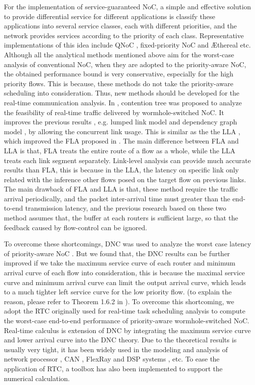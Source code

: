 \documentclass[10pt,journal]{IEEEtran}
\begin{document}
For the implementation of service-guaranteed NoC, a simple and effective solution to provide differential service for different applications is classify these applications into several service classes, each with different priorities, and the network provides services according to the priority of each class. Representative implementations of this idea include QNoC \cite{BCGK04}, fixed-priority NoC \cite{Shi:2008:RCA:1397757.1397996} and {{\AE}thereal} \cite{GoDR05} etc. Although all the analytical methods mentioned above aim for the worst-case analysis of conventional NoC, when they are adopted to the priority-aware NoC, the obtained performance bound is very conservative, especially for the high priority flows. This is because, these methods do not take the priority-aware scheduling into consideration. Thus, new methods should be developed for the real-time communication analysis. In \cite{LuJS05}, contention tree was proposed to analyze the feasibility of real-time traffic delivered by wormhole-switched NoC. It improves the previous results , e.g. lumped link model \cite{707545} and dependency graph model \cite{708526}, by allowing the concurrent link usage. This is similar as the the LLA \cite{73}, which improved the FLA proposed in \cite{Shi:2008:RCA:1397757.1397996}. The main difference between FLA and LLA is that, FLA treats the entire route of a flow as a whole, while the LLA treats each link segment separately. Link-level analysis can provide much accurate results than FLA, this is because in the LLA, the latency on specific link only related with the inference other flows posed on the target flow on previous links. The main drawback of FLA and LLA is that, these method require the traffic arrival periodically, and the packet inter-arrival time must greater than the end-to-end transmission latency, and the previous research based on these two method assumes that, the buffer at each routers is sufficient large, so that the feedback caused by flow-control can be ignored.

To overcome these shortcomings, DNC was used to analyze the worst case latency of priority-aware NoC \cite{Qian489900}. But we found that, the DNC results can be further improved if we take the maximum service curve of each router and minimum arrival curve of each flow into consideration, this is because the maximal service curve and minimum arrival curve can limit the output arrival curve, which leads to a much tighter left service curve for the low priority flow. (to explain the reason, please refer to Theorem 1.6.2 in \cite{Boudec2001Network}). To overcome this shortcoming, we adopt the RTC \cite{1253607} originally used for real-time task scheduling analysis to compute the worst-case end-to-end performance of priority-aware wormhole-switched NoC. Real-time calculus is extension of DNC by integrating the maximum service curve and lower arrival curve into the DNC theory. Due to the theoretical results is usually very tight, it has been widely used in the modeling and analysis of network processor \cite{1253838}, CAN \cite{4617308}, FlexRay \cite{Hagiescu:2007:PAF:1278480.1278554} and DSP systems \cite{thiele2005performance}, etc. To ease the application of RTC, a toolbox \cite{rtc} has also been implemented to support the numerical calculation.
\end{document}
